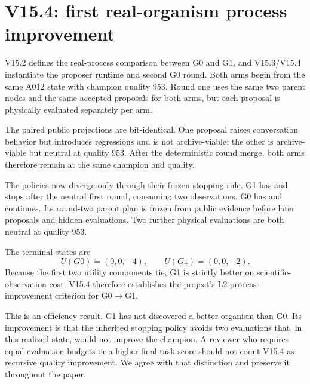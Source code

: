 \section{V15.4: first real-organism process improvement}

V15.2 defines the real-process comparison between G0 and G1, and V15.3/V15.4 instantiate the proposer runtime and second G0 round. Both arms begin from the same A012 state with champion quality 953. Round one uses the same two parent nodes and the same accepted proposals for both arms, but each proposal is physically evaluated separately per arm.

The paired public projections are bit-identical. One proposal raises conversation behavior but introduces regressions and is not archive-viable; the other is archive-viable but neutral at quality 953. After the deterministic round merge, both arms therefore remain at the same champion and quality.

The policies now diverge only through their frozen stopping rule. G1 has  and stops after the neutral first round, consuming two observations. G0 has  and continues. Its round-two parent plan is frozen from public evidence before later proposals and hidden evaluations. Two further physical evaluations are both neutral at quality 953.

The terminal states are
\[
U(G0)=(0,0,-4), \qquad U(G1)=(0,0,-2).
\]
Because the first two utility components tie, G1 is strictly better on scientific-observation cost. V15.4 therefore establishes the project's L2 process-improvement criterion for G0$\rightarrow$G1.

This is an efficiency result. G1 has not discovered a better organism than G0. Its improvement is that the inherited stopping policy avoids two evaluations that, in this realized state, would not improve the champion. A reviewer who requires equal evaluation budgets or a higher final task score should not count V15.4 as recursive quality improvement. We agree with that distinction and preserve it throughout the paper.
